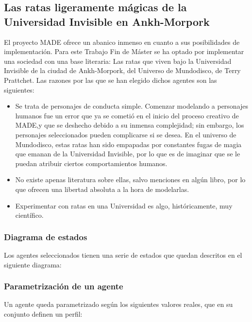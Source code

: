 \subsection{Las ratas ligeramente mágicas de la Universidad Invisible en
Ankh-Morpork }

El proyecto MADE ofrece un abanico inmenso en cuanto a sus posibilidades de
implementación. Para este Trabajo Fin de Máster se ha optado por implementar una
sociedad con una base literaria: Las ratas que viven bajo la Universidad
Invisible de la ciudad de Ankh-Morpork, del Universo de Mundodisco, de Terry
Prattchet. Las razones por las que se han elegido dichos agentes son las
siguientes:

\begin{itemize}
\item Se trata de personajes de conducta simple. Comenzar modelando a personajes humanos fue un error que ya se cometió en el inicio del proceso creativo de MADE,y que se deshecho debido a su inmensa complejidad; sin embargo, los personajes seleccionados pueden complicarse si se desea. En el universo de Mundodisco, estas ratas han sido empapadas por constantes fugas de magia que emanan de la Universidad Invisible, por lo que es de imaginar que se le puedan atribuir ciertos comportamientos humanos.
\item No existe apenas literatura sobre ellas, salvo menciones en algún libro, por lo que ofrecen una libertad absoluta a la hora de modelarlas.
\item Experimentar con ratas en una Universidad es algo, históricamente, muy científico.
\end{itemize}

\subsubsection{Diagrama de estados}

Los agentes seleccionados tienen una serie de estados que quedan descritos en el siguiente diagrama:


\subsubsection{Parametrización de un agente}

Un agente queda parametrizado según los siguientes valores reales, que en su conjunto definen un perfil:

